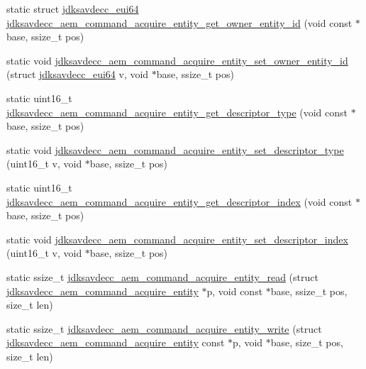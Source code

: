 \begin{DoxyCompactItemize}
\item 
static struct \hyperlink{structjdksavdecc__eui64}{jdksavdecc\+\_\+eui64} \hyperlink{group__command__acquire__entity_ga0f42e37667505e613f1893ffa0289bc2}{jdksavdecc\+\_\+aem\+\_\+command\+\_\+acquire\+\_\+entity\+\_\+get\+\_\+owner\+\_\+entity\+\_\+id} (void const $\ast$base, ssize\+\_\+t pos)
\item 
static void \hyperlink{group__command__acquire__entity_ga7bd9d27911ecb80585dcc4062f2c5831}{jdksavdecc\+\_\+aem\+\_\+command\+\_\+acquire\+\_\+entity\+\_\+set\+\_\+owner\+\_\+entity\+\_\+id} (struct \hyperlink{structjdksavdecc__eui64}{jdksavdecc\+\_\+eui64} v, void $\ast$base, ssize\+\_\+t pos)
\item 
static uint16\+\_\+t \hyperlink{group__command__acquire__entity_ga7d546d1cb0eb5f6bc87590fe461e9092}{jdksavdecc\+\_\+aem\+\_\+command\+\_\+acquire\+\_\+entity\+\_\+get\+\_\+descriptor\+\_\+type} (void const $\ast$base, ssize\+\_\+t pos)
\item 
static void \hyperlink{group__command__acquire__entity_gafe85427400214c628dde618552b0a47f}{jdksavdecc\+\_\+aem\+\_\+command\+\_\+acquire\+\_\+entity\+\_\+set\+\_\+descriptor\+\_\+type} (uint16\+\_\+t v, void $\ast$base, ssize\+\_\+t pos)
\item 
static uint16\+\_\+t \hyperlink{group__command__acquire__entity_ga0f70b08d79abe5e3a682689fe29cd5f4}{jdksavdecc\+\_\+aem\+\_\+command\+\_\+acquire\+\_\+entity\+\_\+get\+\_\+descriptor\+\_\+index} (void const $\ast$base, ssize\+\_\+t pos)
\item 
static void \hyperlink{group__command__acquire__entity_ga3621b340b21c54b21bc010223787f31d}{jdksavdecc\+\_\+aem\+\_\+command\+\_\+acquire\+\_\+entity\+\_\+set\+\_\+descriptor\+\_\+index} (uint16\+\_\+t v, void $\ast$base, ssize\+\_\+t pos)
\item 
static ssize\+\_\+t \hyperlink{group__command__acquire__entity_ga6399f13371a30b1c45f83cb1aecd7e5c}{jdksavdecc\+\_\+aem\+\_\+command\+\_\+acquire\+\_\+entity\+\_\+read} (struct \hyperlink{structjdksavdecc__aem__command__acquire__entity}{jdksavdecc\+\_\+aem\+\_\+command\+\_\+acquire\+\_\+entity} $\ast$p, void const $\ast$base, ssize\+\_\+t pos, size\+\_\+t len)
\item 
static ssize\+\_\+t \hyperlink{group__command__acquire__entity_ga8f6285801e4769fe5ed789c57306f264}{jdksavdecc\+\_\+aem\+\_\+command\+\_\+acquire\+\_\+entity\+\_\+write} (struct \hyperlink{structjdksavdecc__aem__command__acquire__entity}{jdksavdecc\+\_\+aem\+\_\+command\+\_\+acquire\+\_\+entity} const $\ast$p, void $\ast$base, size\+\_\+t pos, size\+\_\+t len)
\end{DoxyCompactItemize}


